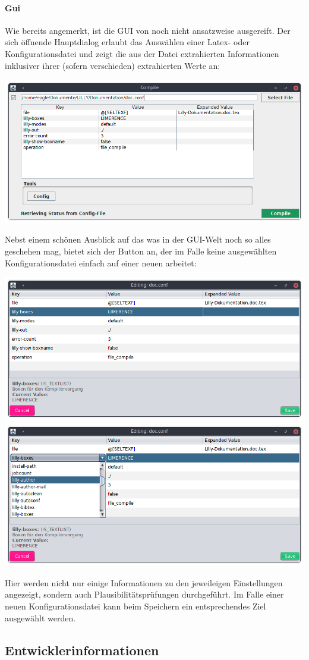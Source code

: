 \paragraph{Gui}
Wie bereits angemerkt, ist die GUI von \Jake noch nicht ansatzweise ausgereift. Der sich öffnende Hauptdialog erlaubt das Auswählen einer Latex- oder Konfigurationsdatei und zeigt die aus der Datei extrahierten Informationen inklusiver ihrer (sofern verschieden) extrahierten Werte an:
\begin{center}
    \includegraphics[width=0.75\linewidth]{Data/Bilder/JakeGUIMain.png}
\end{center}
Nebst einem schönen Ausblick auf das was in der GUI-Welt noch so alles geschehen mag, bietet sich der Button  an, der im Falle keine ausgewählten Konfigurationsdatei einfach auf einer neuen arbeitet:
\begin{center}
    \includegraphics[width=0.5\linewidth]{Data/Bilder/JakeGUIConfig.png}\includegraphics[width=0.5\linewidth]{Data/Bilder/JakeGUIConfigSelection.png}    
\end{center}
Hier werden nicht nur einige Informationen zu den jeweileigen Einstellungen angezeigt, sondern auch Plausibilitätsprüfungen durchgeführt. Im Falle einer neuen Konfigurationsdatei kann beim Speichern ein entsprechendes Ziel ausgewählt werden. 

\subsection{Entwicklerinformationen}
